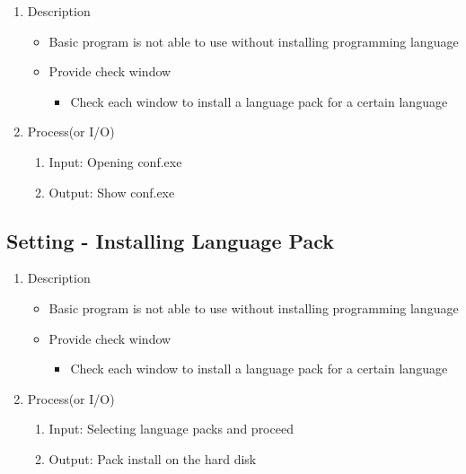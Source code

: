 \documentclass[conference]{IEEEtran}
\begin{document}
\begin{itemize}
\begin{itemize}
\begin{itemize}
\begin{itemize}
\begin{enumerate}
  \item Description
  \begin{itemize}
    \item Basic program is not able to use without installing programming language
    \item Provide check window
    \begin{itemize} 
      \item Check each window to install a language pack for a certain language 
    \end{itemize}
  \end{itemize}
  \item Process(or I/O)
  \begin{enumerate}
    \item Input: Opening conf.exe
    \item Output: Show conf.exe
  \end{enumerate}
\end{enumerate}

\textit{}

\subsection{Setting - Installing Language Pack}
\begin{enumerate}
  \item Description
  \begin{itemize}
    \item Basic program is not able to use without installing programming language
    \item Provide check window
    \begin{itemize}
      \item Check each window to install a language pack for a certain language 
    \end{itemize}
  \end{itemize}
  \item Process(or I/O)
  \begin{enumerate}
    \item Input: Selecting language packs and proceed 
    \item Output: Pack install on the hard disk
  \end{enumerate}
\end{enumerate}


\textit{}

\end{itemize}
\end{itemize}
\end{itemize}
\end{itemize}
\end{document}
